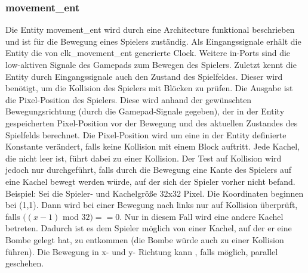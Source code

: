 \documentclass[parskip=full]{scrartcl}
\begin{document}
				\subsubsection{movement\_ent}
					Die Entity movement\_ent wird durch eine Architecture funktional beschrieben und ist für die Bewegung eines Spielers zuständig. Als Eingangssignale erhält die Entity die von clk\_movement\_ent generierte Clock. Weitere in-Ports sind die low-aktiven Signale des Gamepads zum Bewegen des Spielers. Zuletzt kennt die Entity durch Eingangssignale auch den Zustand des Spielfeldes. Dieser wird benötigt, um die Kollision des Spielers mit Blöcken zu prüfen.
					Die Ausgabe ist die Pixel-Position des Spielers.
					Diese wird anhand der gewünschten Bewegungsrichtung (durch die Gamepad-Signale gegeben), der in der Entity gespeicherten Pixel-Position vor der Bewegung und des aktuellen Zustandes des Spielfelds berechnet. Die Pixel-Position wird um eine in der Entity definierte Konstante verändert, falls keine Kollision mit einem Block auftritt. Jede Kachel, die nicht leer ist, führt dabei zu einer Kollision.
					Der Test auf Kollision wird jedoch nur durchgeführt, falls durch die Bewegung eine Kante des Spielers auf eine Kachel bewegt werden würde, auf der sich der Spieler vorher nicht befand. \newline
					Beispiel: Sei die Spieler- und Kachelgröße 32x32 Pixel. Die Koordinaten beginnen bei (1,1). Dann wird bei einer Bewegung nach links nur auf Kollision überprüft, falls $((x-1)$ mod $32) == 0$. Nur in diesem Fall wird eine andere Kachel betreten.\newline
					Dadurch ist es dem Spieler möglich von einer Kachel, auf der er eine Bombe gelegt hat, zu entkommen (die Bombe würde auch zu einer Kollision führen).
					Die Bewegung in x- und y- Richtung kann , falls möglich, parallel geschehen.
\end{document}
